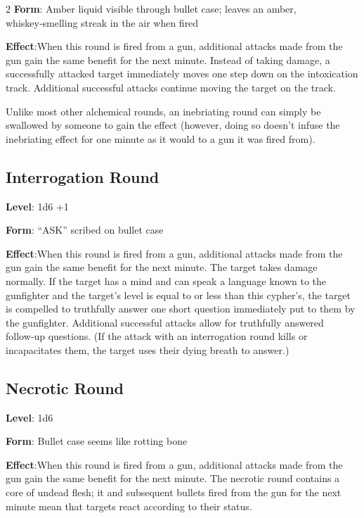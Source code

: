 \begin{multicols}{2}
\textbf{Form}: Amber liquid visible through bullet case; leaves an amber, whiskey‑smelling streak in the air when fired 

\textbf{Effect}:When this round is fired from a gun, additional attacks made from the gun gain the same benefit for the next minute. Instead of taking damage, a successfully attacked target immediately moves one step down on the intoxication track. Additional successful attacks continue moving the target on the track. 

Unlike most other alchemical rounds, an inebriating round can simply be swallowed by someone to gain the effect (however, doing so doesn’t infuse the inebriating effect for one minute as it would to a gun it was fired from). 

\subsection{Interrogation Round}

\textbf{Level}: 1d6 +1 

\textbf{Form}: “ASK” scribed on bullet case 

\textbf{Effect}:When this round is fired from a gun, additional attacks made from the gun gain the same benefit for the next minute. The target takes damage normally. If the target has a mind and can speak a language known to the gunfighter and the target’s level is equal to or less than this cypher’s, the target is compelled to truthfully answer one short question immediately put to them by the gunfighter. Additional successful attacks allow for truthfully answered follow‑up questions. (If the attack with an interrogation round kills or incapacitates them, the target uses their dying breath to answer.)

\subsection{Necrotic Round}

\textbf{Level}: 1d6 

\textbf{Form}: Bullet case seems like rotting bone 

\textbf{Effect}:When this round is fired from a gun, additional attacks made from the gun gain the same benefit for the next minute. 
The necrotic round contains a core of undead flesh; it and subsequent bullets fired from the gun for the next minute mean that targets react according to their status. 


\end{multicols}
